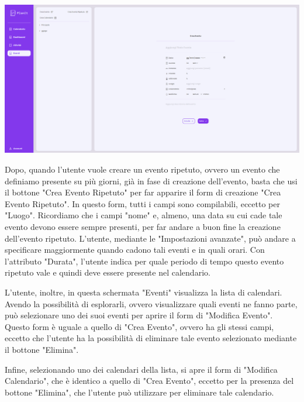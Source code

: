 \begin{center}
    \includegraphics[width=1\textwidth, height=0.3\textheight]{img/png/FrontEnd/Eventi/EventiCreaEvento.png}
\end{center}

Dopo, quando l'utente vuole creare un evento ripetuto, ovvero un evento che definiamo presente su più giorni, già in fase di creazione dell'evento, basta che usi il bottone "Crea Evento Ripetuto" per far apparire il form di creazione "Crea Evento Ripetuto". In questo form, tutti i campi sono compilabili, eccetto per "Luogo". Ricordiamo che i campi "nome" e, almeno, una data su cui cade tale evento devono essere sempre presenti, per far andare a buon fine la creazione dell'evento ripetuto. L'utente, mediante le "Impostazioni avanzate", può andare a specificare maggiormente quando cadono tali eventi e in quali orari. Con l'attributo "Durata", l'utente indica per quale periodo di tempo questo evento ripetuto vale e quindi deve essere presente nel calendario.

L'utente, inoltre, in questa schermata "Eventi" visualizza la lista di calendari. Avendo la possibilità di esplorarli, ovvero visualizzare quali eventi ne fanno parte, può selezionare uno dei suoi eventi per aprire il form di "Modifica Evento". Questo form è uguale a quello di "Crea Evento", ovvero ha gli stessi campi, eccetto che l'utente ha la possibilità di eliminare tale evento selezionato mediante il bottone "Elimina".


Infine, selezionando uno dei calendari della lista, si apre il form di "Modifica Calendario", che è identico a quello di "Crea Evento", eccetto per la presenza del bottone "Elimina", che l'utente può utilizzare per eliminare tale calendario.